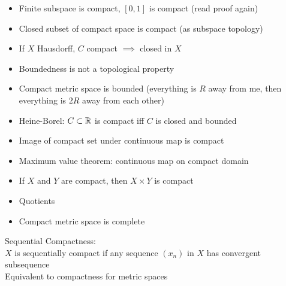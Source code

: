 \begin{itemize}
    \item Finite subspace is compact, $[0,1]$ is compact (read proof again)
    \item Closed subset of compact space is compact (as subspace topology)
    \item If $X$ Hausdorff, $C$ compact $\implies$ closed in $X$
    \item Boundedness is not a topological property
    \item Compact metric space is bounded (everything is $R$ away from me, then everything is $2R$ away from each other)
    \item Heine-Borel: $C \subset \mathbb{R}$ is compact iff $C$ is closed and bounded
    \item Image of compact set under continuous map is compact
    \item Maximum value theorem: continuous map on compact domain
    \item If $X$ and $Y$ are compact, then $X \times Y$ is compact
    \item Quotients
    \item Compact metric space is complete
\end{itemize}


Sequential Compactness: \\
$X$ is sequentially compact if any sequence $(x_n)$ in $X$ has convergent subsequence\\
Equivalent to compactness for metric spaces



